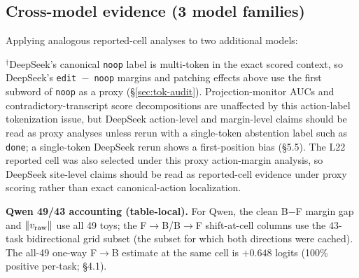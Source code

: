 \documentclass[
  11pt,
  a4paper]{article}
\begin{document}
\subsection{Cross-model evidence (3 model
families)}\label{cross-model-evidence-3-model-families}

Applying analogous reported-cell analyses to two additional models:

\begingroup
\setlength{\tabcolsep}{4pt}

\noindent{} \endgroup

\(^\dagger\)DeepSeek's canonical \texttt{noop} label is multi-token in
the exact scored context, so DeepSeek's \texttt{edit\ \ensuremath{-}\ noop} margins
and patching effects above use the first subword of \texttt{noop} as a
proxy (\S{}\ref{sec:tok-audit}). Projection-monitor AUCs and
contradictory-transcript score decompositions are unaffected by this
action-label tokenization issue, but DeepSeek action-level and
margin-level claims should be read as proxy analyses unless rerun with a
single-token abstention label such as \texttt{done}; a single-token
DeepSeek rerun shows a first-position bias (\S{}5.5). The L22 reported cell
was also selected under this proxy action-margin analysis, so DeepSeek
site-level claims should be read as reported-cell evidence under proxy
scoring rather than exact canonical-action localization.

\textbf{Qwen 49/43 accounting (table-local).} For Qwen, the clean
B\(-\)F margin gap and \(\|v_{\rm raw}\|\) use all 49 toys; the
F\(\to\)B/B\(\to\)F shift-at-cell columns use the 43-task bidirectional
grid subset (the subset for which both directions were cached). The
all-49 one-way F\(\to\)B estimate at the same cell is \(+0.648\) logits
(100\% positive per-task; \S{}4.1).
\end{document}
